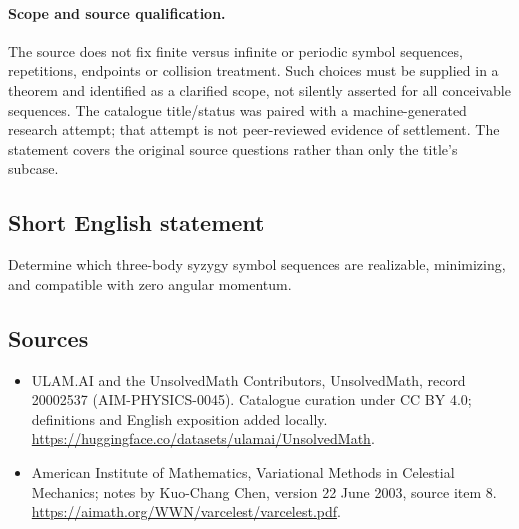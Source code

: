 \documentclass[11pt]{article}
\begin{document}
\paragraph{Scope and source qualification.}The source does not fix finite versus infinite or periodic symbol sequences, repetitions, endpoints or collision treatment. Such choices must be supplied in a theorem and identified as a clarified scope, not silently asserted for all conceivable sequences. The catalogue title/status was paired with a machine-generated research attempt; that attempt is not peer-reviewed evidence of settlement. The statement covers the original source questions rather than only the title’s subcase.
\subsection{Short English statement}
Determine which three-body syzygy symbol sequences are realizable, minimizing, and compatible with zero angular momentum.
\subsection{Sources}
\begin{itemize}
\item[\hypertarget{source:20002537:1}{S1}] ULAM.AI and the UnsolvedMath Contributors, UnsolvedMath, record 20002537 (AIM-PHYSICS-0045). Catalogue curation under CC BY 4.0; definitions and English exposition added locally.
\url{https://huggingface.co/datasets/ulamai/UnsolvedMath}.
\item[\hypertarget{source:20002537:2}{S2}] American Institute of Mathematics, Variational Methods in Celestial Mechanics; notes by Kuo-Chang Chen, version 22 June 2003, source item 8.
\url{https://aimath.org/WWN/varcelest/varcelest.pdf}.
\end{itemize}
\label{end:20002537}
\end{document}
